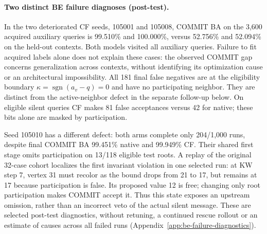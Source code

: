 \paragraph{Two distinct BE failure diagnoses (post-test).}
In the two deteriorated CF seeds, 105001 and 105008, COMMIT BA on the 3,600
acquired auxiliary queries is 99.510\% and 100.000\%, versus 52.756\%
and 52.094\% on the held-out contexts. Both models visited all auxiliary
queries. Failure to fit acquired labels alone does not explain these cases:
the observed COMMIT gap concerns generalization across contexts, without
identifying its optimization cause or an architectural impossibility.
All 181 final false negatives are at the eligibility boundary
$\kappa=\operatorname{sgn}(a_v-q)=0$ and have no participating neighbor.
They are distinct from the active-neighbor defect in the separate
follow-up below. On eligible silent queries CF makes 81 false acceptances
versus 42 for native; these bits alone are masked by participation.

Seed 105010 has a different defect: both arms complete only 204/1,000 runs,
despite final COMMIT BA 99.451\% native and 99.949\% CF. Their shared
first stage omits participation on 13/118 eligible test roots.
A replay of the original 32-case cohort localizes the first invariant
violation in one selected run: at KW step 7, vertex 31 must
recolor as the bound drops from 21 to 17, but remains at 17
because participation is false. Its proposed value 12 is free;
changing only root participation makes COMMIT accept it. Thus this state
exposes an upstream omission, rather than an incorrect veto of the actual
silent message. These are selected post-test diagnostics, without retuning,
a continued rescue rollout or an estimate of causes across all failed runs
(Appendix~\ref{app:be-failure-diagnostics}).
